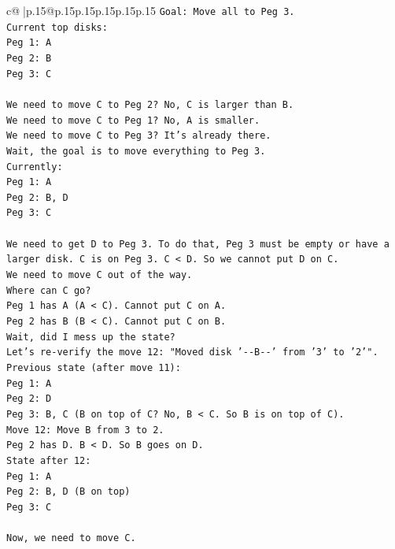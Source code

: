 \documentclass{article}
\begin{document}
{\begin{supertabular}{c@{$\;$}|p{.15\linewidth}@{}p{.15\linewidth}p{.15\linewidth}p{.15\linewidth}p{.15\linewidth}p{.15\linewidth}}
{{{\texttt{Goal: Move all to Peg 3.} \\
\texttt{Current top disks:} \\
\texttt{Peg 1: A} \\
\texttt{Peg 2: B} \\
\texttt{Peg 3: C} \\
\\ 
\texttt{We need to move C to Peg 2? No, C is larger than B.} \\
\texttt{We need to move C to Peg 1? No, A is smaller.} \\
\texttt{We need to move C to Peg 3? It's already there.} \\
\texttt{Wait, the goal is to move everything to Peg 3.} \\
\texttt{Currently:} \\
\texttt{Peg 1: A} \\
\texttt{Peg 2: B, D} \\
\texttt{Peg 3: C} \\
\\ 
\texttt{We need to get D to Peg 3. To do that, Peg 3 must be empty or have a larger disk. C is on Peg 3. C < D. So we cannot put D on C.} \\
\texttt{We need to move C out of the way.} \\
\texttt{Where can C go?} \\
\texttt{Peg 1 has A (A < C). Cannot put C on A.} \\
\texttt{Peg 2 has B (B < C). Cannot put C on B.} \\
\texttt{Wait, did I mess up the state?} \\
\texttt{Let's re{-}verify the move 12: "Moved disk '{-}{-}B{-}{-}' from '3' to '2'".} \\
\texttt{Previous state (after move 11):} \\
\texttt{Peg 1: A} \\
\texttt{Peg 2: D} \\
\texttt{Peg 3: B, C (B on top of C? No, B < C. So B is on top of C).} \\
\texttt{Move 12: Move B from 3 to 2.} \\
\texttt{Peg 2 has D. B < D. So B goes on D.} \\
\texttt{State after 12:} \\
\texttt{Peg 1: A} \\
\texttt{Peg 2: B, D (B on top)} \\
\texttt{Peg 3: C} \\
\\ 
\texttt{Now, we need to move C.} \\
}}}
\end{supertabular}}
\end{document}
